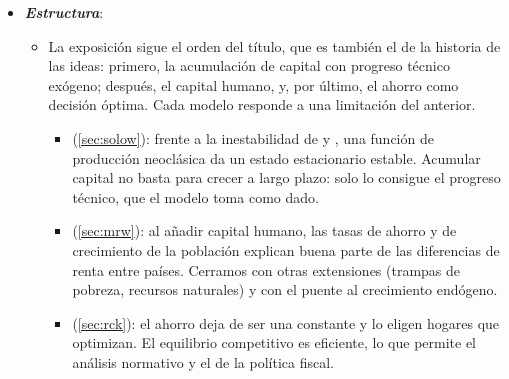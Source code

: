 \documentclass[11pt]{article}
\begin{document}
\begin{itemize}
\item \textbf{\emph{Estructura}}:
  \begin{itemize}
  \item La exposición sigue el orden del título, que es también el de la historia de las ideas: primero, la acumulación de capital con progreso técnico exógeno; después, el capital humano, y, por último, el ahorro como decisión óptima. Cada modelo responde a una limitación del anterior.
  \begin{itemize}
  \item {} (\ref{sec:solow}): frente a la inestabilidad de  y , una función de producción neoclásica da un estado estacionario estable. Acumular capital no basta para crecer a largo plazo: solo lo consigue el progreso técnico, que el modelo toma como dado.
  \item {} (\ref{sec:mrw}): al añadir capital humano, las tasas de ahorro y de crecimiento de la población explican buena parte de las diferencias de renta entre países. Cerramos con otras extensiones (trampas de pobreza, recursos naturales) y con el puente al crecimiento endógeno.
  \item {} (\ref{sec:rck}): el ahorro deja de ser una constante y lo eligen hogares que optimizan. El equilibrio competitivo es eficiente, lo que permite el análisis normativo y el de la política fiscal.
  \end{itemize}
  \end{itemize}
\end{itemize}
\end{document}
